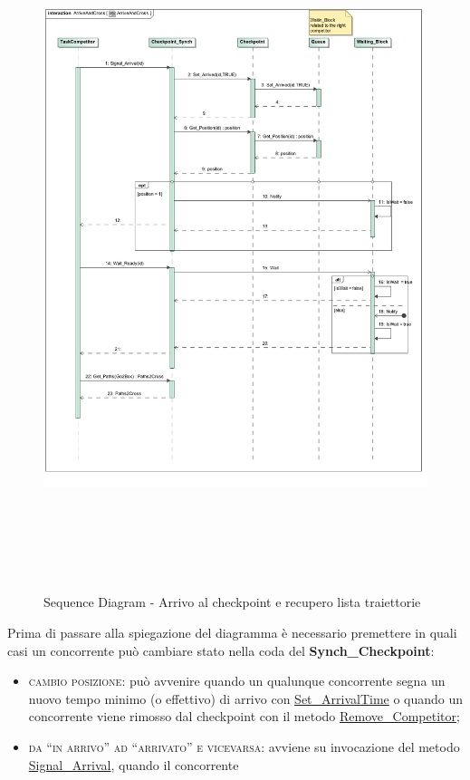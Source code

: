 \begin{description}
\begin{center}
\begin{figure}[h!]
	\includegraphics[scale=0.50,height=20cm]{img/SequenceDiagrams/ArriveAndCross.jpg}
\caption{Sequence Diagram - Arrivo al checkpoint e recupero lista traiettorie}
\end{figure}
\end{center}
\clearpage
Prima di passare alla spiegazione del diagramma \`{e} necessario premettere in quali casi un concorrente pu\`{o} cambiare stato nella coda del \textbf{Synch\_Checkpoint}:
\begin{itemize}
\item \textsc{cambio posizione}: pu\`{o} avvenire quando un qualunque concorrente segna un nuovo tempo minimo (o effettivo) 
di arrivo con \underline{Set\_ArrivalTime} o quando un concorrente viene rimosso dal checkpoint con il metodo \underline{Remove\_Competitor};
\item \textsc{da ``in arrivo'' ad ``arrivato'' e vicevarsa}: avviene su invocazione del metodo \underline{Signal\_Arrival}, quando il concorrente

\end{itemize}
\end{description}
